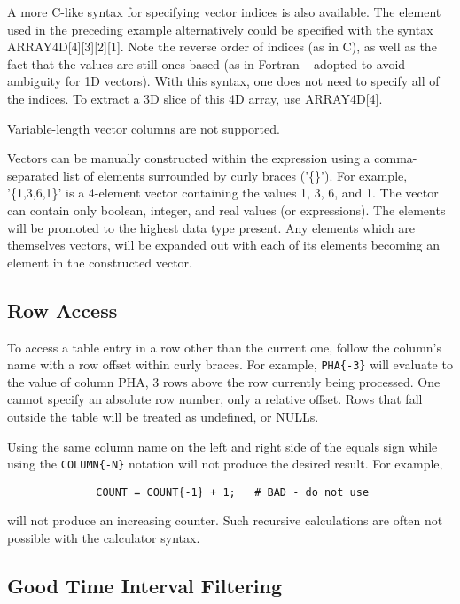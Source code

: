 \documentclass[11pt]{book}
\begin{document}
    A  more  C-like  syntax  for  specifying  vector  indices  is   also
    available.   The element used in the preceding example alternatively
    could be specified with the syntax  ARRAY4D[4][3][2][1].   Note  the
    reverse  order  of  indices  (as in C), as well as the fact that the
    values are still ones-based (as  in  Fortran  --  adopted  to  avoid
    ambiguity  for  1D vectors).  With this syntax, one does not need to
    specify all of the indices.  To  extract  a  3D  slice  of  this  4D
    array, use ARRAY4D[4].

    Variable-length vector columns are not supported.

    Vectors can  be manually constructed  within the expression  using a
    comma-separated list of  elements surrounded by curly braces ('\{\}').
    For example, '\{1,3,6,1\}' is a 4-element vector containing the values
    1, 3, 6, and 1.  The  vector can contain  only boolean, integer, and
    real values (or expressions).  The elements will  be promoted to the
    highest  data type   present.  Any   elements   which  are themselves
    vectors, will be expanded out with  each of its elements becoming an
    element in the constructed vector.

\subsection{Row Access}

    To access a table entry in a row other  than the current one, follow
    the  column's name  with  a row  offset  within  curly  braces.  For
    example, \verb+PHA{-3}+ will evaluate to the value  of column PHA, 3 rows
    above  the  row currently  being processed.   One  cannot specify an
    absolute row number, only a relative offset.  Rows that fall outside
    the table will be treated as undefined, or NULLs.

    Using the same column name on the left and right side of the equals
    sign while using the \verb+COLUMN{-N}+ notation will not produce the desired
    result.  For example,
\begin{verbatim}
              COUNT = COUNT{-1} + 1;   # BAD - do not use
\end{verbatim}
    will not produce an increasing counter.  Such recursive
    calculations are often not possible with the calculator syntax.   

\subsection{Good Time Interval Filtering}
\end{document}
